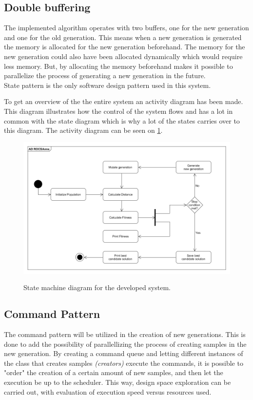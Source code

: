 \subsection{Double buffering}
The implemented algorithm operates with two buffers, one for the new generation and one for the old generation. This means when a new generation is generated the memory is allocated for the new generation beforehand. The memory for the new generation could also have been allocated dynamically which would require less memory. But, by allocating the memory beforehand makes it possible to parallelize the process of generating a new generation in the future.\\   
State pattern is the only software design pattern used in this system. 

To get an overview of the the entire system an activity diagram has been made. This diagram illustrates how the control of the system flows and has a lot in common with the state diagram which is why a lot of the states carries over to this diagram. The activity diagram can be seen on \cref{fig:Activity_diagram}.

\begin{figure}[H]
	\centering
	{\includegraphics[width=\textwidth]{Images/AD_ROGSAnne.PNG}}\\[0.5cm]
	\caption{State machine diagram for the developed system.}
	\label{fig:Activity_diagram}
\end{figure}



\subsection{Command Pattern}
The command pattern will be utilized in the creation of new generations. This is done to add the possibility of parallellizing the process of creating samples in the new generation. By creating a command queue and letting different instances of the class that creates samples \textit{(creators)} execute the commands, it is possible to "order" the creation of a certain amount of new samples, and then let the execution be up to the scheduler. This way, design space exploration can be carried out, with evaluation of execution speed versus resources used.